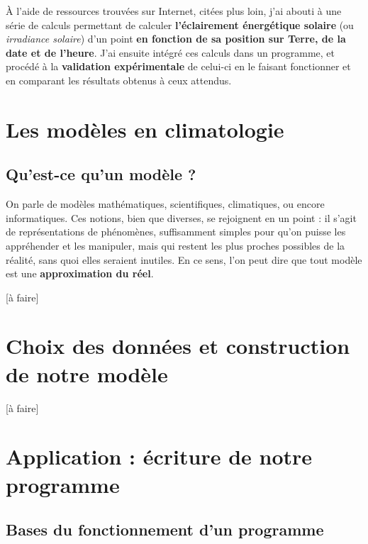 \documentclass[12pt]{article}
\begin{document}
À l'aide de ressources trouvées sur Internet, citées plus loin, j'ai abouti à une série de calculs permettant de calculer \textbf{l'éclairement énergétique solaire} (ou \textit{irradiance solaire}) d'un point \textbf{en fonction de sa position sur Terre, de la date et de l'heure}.
J'ai ensuite intégré ces calculs dans un programme, et procédé à la \textbf{validation expérimentale} de celui-ci en le faisant fonctionner et en comparant les résultats obtenus à ceux attendus.

\section{Les modèles en climatologie}

\subsection{Qu'est-ce qu'un modèle ?}

On parle de modèles mathématiques, scientifiques, climatiques, ou encore informatiques.
Ces notions, bien que diverses, se rejoignent en un point : il s'agit de représentations de phénomènes, suffisamment simples pour qu'on puisse les appréhender et les manipuler, mais qui restent les plus proches possibles de la réalité, sans quoi elles seraient inutiles.
En ce sens, l'on peut dire que tout modèle est une \textbf{approximation du réel}.

[à faire]

\section{Choix des données et construction de notre modèle}

[à faire]


\section{Application : écriture de notre programme}

\subsection{Bases du fonctionnement d'un programme}
\end{document}
